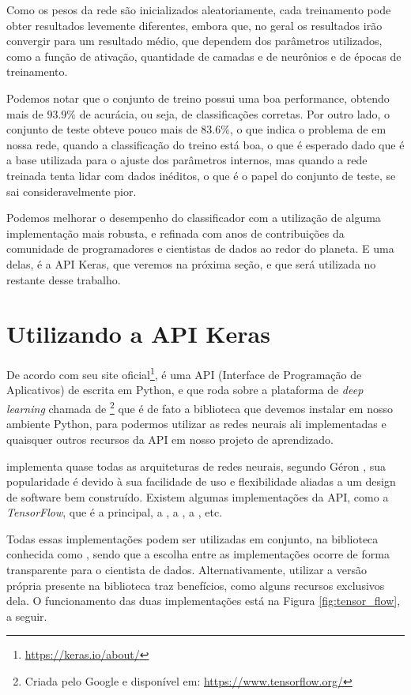 Como os pesos da rede são inicializados aleatoriamente, cada treinamento pode obter resultados levemente diferentes, embora que, no geral os resultados irão convergir para um resultado médio, que dependem dos parâmetros utilizados, como a função de ativação, quantidade de camadas e de neurônios e de épocas de treinamento.

Podemos notar que o conjunto de treino possui uma boa performance, obtendo mais de $93.9\%$ de acurácia, ou seja, de classificações corretas. Por outro lado, o conjunto de teste obteve pouco mais de $83.6\%$, o que indica o problema de  em nossa rede, quando a classificação do treino está boa, o que é esperado dado que é a base utilizada para o ajuste dos parâmetros internos, mas quando a rede treinada tenta lidar com dados inéditos, o que é o papel do conjunto de teste, se sai consideravelmente pior.

Podemos melhorar o desempenho do classificador com a utilização de alguma implementação mais robusta, e refinada com anos de contribuições da comunidade de programadores e cientistas de dados ao redor do planeta. E uma delas, é a API Keras, que veremos na próxima seção, e que será utilizada no restante desse trabalho.

\section{Utilizando a API Keras}

De acordo com seu site oficial\footnote{\url{https://keras.io/about/}},  é uma API (Interface de Programação de Aplicativos) de  escrita em Python, e que roda sobre a plataforma de \emph{deep learning} chamada de \footnote{Criada pelo Google e disponível em: \url{https://www.tensorflow.org/}} que é de fato a biblioteca que devemos instalar em nosso ambiente Python, para podermos utilizar as redes neurais ali implementadas e quaisquer outros recursos da API  em nosso projeto de aprendizado.

 implementa quase todas as arquiteturas de redes neurais, segundo Géron \citep{hands}, sua popularidade é devido à sua facilidade de uso e flexibilidade aliadas a um design de software bem construído. Existem algumas implementações da API, como a \emph{TensorFlow}, que é a principal, a , a , a , etc. 

Todas essas implementações podem ser utilizadas em conjunto, na biblioteca conhecida como , sendo que a escolha entre as implementações ocorre de forma transparente para o cientista de dados. Alternativamente, utilizar a versão própria presente na biblioteca  traz benefícios, como alguns recursos exclusivos dela. O funcionamento das duas implementações está na Figura \ref{fig:tensor_flow}, a seguir.

